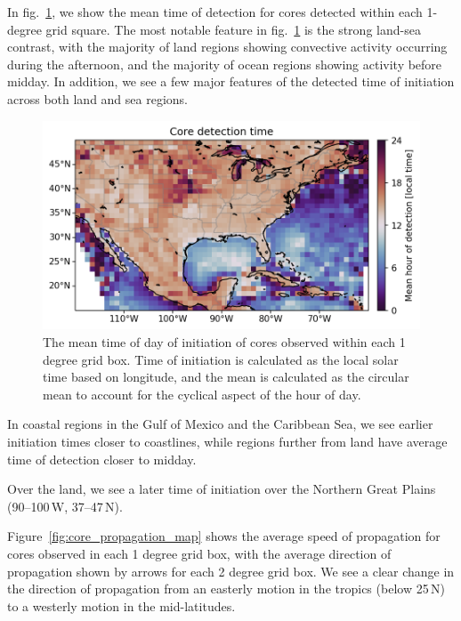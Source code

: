 In fig.~\ref{fig:core_detection_time_map}, we show the mean time of detection for cores detected within each 1-degree grid square.
The most notable feature in fig.~\ref{fig:core_detection_time_map} is the strong land-sea contrast, with the majority of land regions showing convective activity occurring during the afternoon, and the majority of ocean regions showing activity before midday.
In addition, we see a few major features of the detected time of initiation across both land and sea regions.

\begin{figure}[tp]
    \centering
    \includegraphics[width=\textwidth]{figures/ch2_05.png}
    \caption[
    The mean time of day of initiation of cores observed within each 1 degree grid box
    ]{
    The mean time of day of initiation of cores observed within each 1 degree grid box. Time of initiation is calculated as the local solar time based on longitude, and the mean is calculated as the circular mean to account for the cyclical aspect of the hour of day.
    }
    \label{fig:core_detection_time_map}
\end{figure}

In coastal regions in the Gulf of Mexico and the Caribbean Sea, we see earlier initiation times closer to coastlines, while regions further from land have average time of detection closer to midday.


Over the land, we see a later time of initiation over the Northern Great Plains (90--100\,\textdegree W, 37--47\,\textdegree N).

Figure~\ref{fig:core_propagation_map} shows the average speed of propagation for cores observed in each 1 degree grid box, with the average direction of propagation shown by arrows for each 2 degree grid box.
We see a clear change in the direction of propagation from an easterly motion in the tropics (below 25\,\textdegree N) to a westerly motion in the mid-latitudes.

